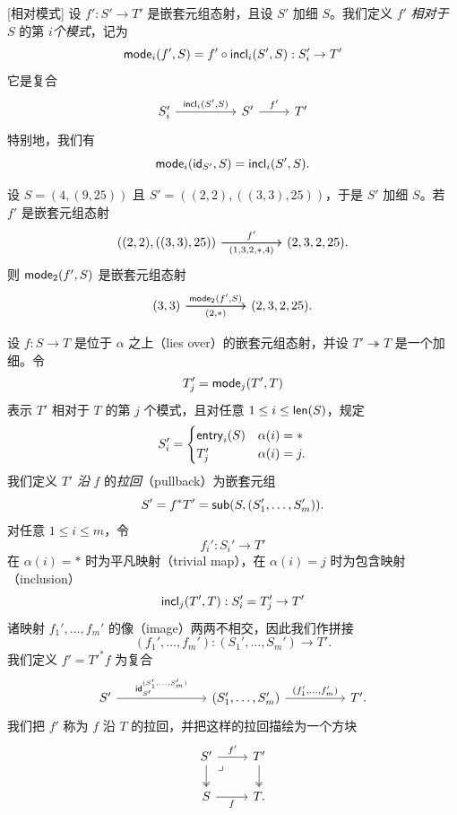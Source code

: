 \begin{construction}\label{definitionofrelativemodes}[相对模式]
    设 $f':S' \to T'$ 是嵌套元组态射，且设 $S'$ 加细 $S$。我们定义 $f'$ {\it 相对于} $S$ 的第 $i${\it 个模式}，记为
    \[
    \mathsf{mode}_i(f',S) = f' \circ \mathsf{incl}_i(S',S): S_i' \to T'
    \]
    它是复合
    \[
    \begin{tikzcd} S_i' \ar[rr ,"\incl_i(S'{,}S)"] & & S' \ar[r,"f'"] &  T'
    \end{tikzcd} 
    \]
    特别地，我们有
    \[
    \mathsf{mode}_i(\mathsf{id}_{S'},S) = \mathsf{incl}_i(S',S).
    \]
\end{construction}

\begin{example}
    设 $S = (4,(9,25))$ 且 $S' = ((2,2),((3,3),25))$，于是 $S'$ 加细 $S$。若 $f'$ 是嵌套元组态射
    \[ \begin{tikzcd} 
    ((2,2),((3,3),25)) \ar[rr,"f'"] \ar[rr,swap,"(1{,}3{,}2{,}*{,}4)"] & & (2,3,2,25).
    \end{tikzcd} \]
    则 $\mathsf{mode}_2(f',S)$ 是嵌套元组态射
    \[ \begin{tikzcd} 
    (3,3) \ar[rr,"\mode_2(f'{,}S)"] \ar[rr,swap,"(2{,}*)"] & & (2,3,2,25).
    \end{tikzcd} \]
\end{example}





\begin{construction}[拉回]
    设 $f:S \to T$ 是位于 $\alpha$ 之上（lies over）的嵌套元组态射，并设 $T' \twoheadrightarrow T$ 是一个加细。令
    \[
    T_j' = \mathsf{mode}_j(T',T)
    \]
    表示 $T'$ 相对于 $T$ 的第 $j$ 个模式，且对任意 $1 \leq i \leq \mathsf{len}(S)$，规定
    \[
    S_i' = 
    \begin{cases} 
    \mathsf{entry}_i(S) & \alpha(i) = *\\
    T'_j & \alpha(i) = j.
    \end{cases}
    \] 
    我们定义 $T'$ {\it 沿} $f$ 的{\it 拉回}（pullback）为嵌套元组
    \[
    S' = f^*T' = \mathsf{sub}(S,(S_1',\dots,S_m')).
    \]
    对任意 $1 \leq i \leq m$，令
    \[
    f_i' :S_i' \to T'
    \]
    在 $\alpha(i) = *$ 时为平凡映射（trivial map），在 $\alpha(i) = j$ 时为包含映射（inclusion）
    \[
    \mathsf{incl}_j(T',T):S_i' = T_j' \to T'
    \]
    诸映射 $f_1',\dots,f_m'$ 的像（image）两两不相交，因此我们作拼接
    \[
    (f_1',\dots,f_m') : (S_1',\dots,S_m') \to T'.
    \]
    我们定义 $f' = T'^*f$ 为复合
    \[ \begin{tikzcd}
    S' \ar[rrr,"\id_{S'}^{(S_1'{,}\dots{,}S_m')}"] & & &  (S_1',\dots,S_m') \ar[rr,"(f_1'{,}\dots{,}f_m')"] & & T'.
    \end{tikzcd} \]
    我们把 $f'$ 称为 $f$ 沿 $T$ 的拉回，并把这样的拉回描绘为一个方块
    \[ \begin{tikzcd} 
    S' \ar[r,"f'"] \ar[d, two heads] \arrow[dr, phantom, "\lrcorner", very near start] & T' \ar[d,two heads] \\
    S \ar[r,swap,"f"] & T.
    \end{tikzcd} \]
\end{construction}

